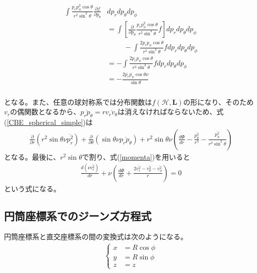 \begin{align}
\begin{aligned}
	\int \frac{p_r p^2_{\phi}\cos\theta}{r^2\sin^3\theta}\frac{\partial f}{\partial p_{\theta}}& dp_r dp_{\theta} dp_{\phi} \\
	&= \int \left[ \frac{\partial}{\partial p_{\theta}}\frac{p_r p^2_{\phi}\cos\theta}{r^2\sin^3\theta}f\right] dp_r dp_{\theta} dp_{\phi} \\
	& \hspace{1cm}- \int \frac{2p_r p_{\phi}\cos\theta}{r^2\sin^3\theta}f dp_r dp_{\theta} dp_{\phi} \\
	&= -\int \frac{2p_r p_{\phi}\cos\theta}{r^2\sin^3\theta}f dp_r dp_{\theta} dp_{\phi} \\
	&= -\frac{2\overline{p_r}\overline{p_{\phi}}\cos\theta\nu}{\sin\theta} \\
\end{aligned}
\end{align}

となる。また、任意の球対称系では分布関数は$f(\mathcal{H}, \bm L)$の形になり、そのため$v_r$の偶関数となるから、$\overline{p_r p_{\theta}} = r\overline{v_r v_{\theta}}$は消えなければならないため、式(\ref{CBE_spherical_simple})は
\begin{align}
	\frac{\partial}{\partial r}(r^2\sin\theta\nu\overline{p_r^2}) + \frac{\partial}{\partial \theta}(\sin\theta\nu\overline{p_rp_{\theta}}) + r^2\sin\theta\nu\left(\frac{d\Phi}{dr} - \frac{\overline{p_{\theta}^2}}{r^3} - \frac{\overline{p_{\phi}^2}}{r^3\sin^2\theta}\right)
\end{align}
となる。最後に、$r^2\sin\theta$で割り、式(\ref{momenta})を用いると
\begin{align}
	\frac{d(\nu \overline{v_r^2})}{dr} + \nu \left(\frac{d\Phi}{dr} + \frac{2\overline{v_r^2} - \overline{v_{\theta}^2} - \overline{v_{\phi}^2}}{r} \right) = 0
\end{align} 
という式になる。


\subsection{円筒座標系でのジーンズ方程式}
円筒座標系と直交座標系の間の変換式は次のようになる。
\begin{align}
	\begin{cases}
		x &= R\cos\phi \\
		y &= R\sin\phi \\
		z &= z
	\end{cases}
\end{align}

